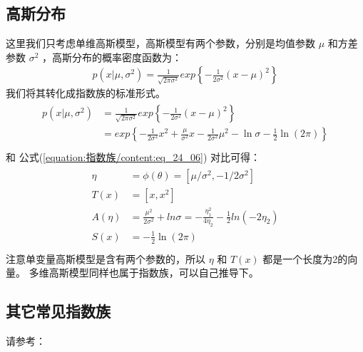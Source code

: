 \documentclass[letterpaper,10pt,english]{sphinxmanual}
\begin{document}
\subsection{高斯分布}
\label{\detokenize{_u6307_u6570_u65cf/content:id6}}
这里我们只考虑单维高斯模型，高斯模型有两个参数，分别是均值参数 \(\mu\)
和方差参数 \(\sigma^2\) ，高斯分布的概率密度函数为：
\begin{equation}\label{equation:指数族/content:指数族/content:15}
\begin{split}p(x|\mu,\sigma^2) = \frac{1}{\sqrt{2\pi\sigma^2}} exp \left \{ -\frac{1}{2\sigma^2}(x-\mu)^2 \right \}\end{split}
\end{equation}
我们将其转化成指数族的标准形式。
\begin{align}\label{equation:指数族/content:指数族/content:16}\!\begin{aligned}
p(x|\mu,\sigma^2) &= \frac{1}{\sqrt{2\pi\sigma^2}} exp \left \{ -\frac{1}{2\sigma^2}(x-\mu)^2 \right \}\\
& =  exp \left \{ -\frac{1}{2\sigma^2} x^2 + \frac{\mu}{\sigma^2} x -\frac{1}{2\sigma^2}\mu^2
 -\ln \sigma - \frac{1}{2} \ln (2\pi) \right \}\\
\end{aligned}\end{align}
和 公式(\ref{equation:指数族/content:eq_24_06}) 对比可得：
\begin{align}\label{equation:指数族/content:指数族/content:17}\!\begin{aligned}
\eta &= \phi(\theta)=\left [ \mu / \sigma^2 ,-1 /2 \sigma^2 \right ]\\
T(x) &= \left [ x ,x^2 \right ]\\
A(\eta) &= \frac{\mu^2}{2\sigma^2} +ln \sigma = -\frac{\eta_1^2}{4\eta_2} - \frac{1}{2}ln(-2\eta_2)\\
S(x) &= - \frac{1}{2} \ln (2\pi)\\
\end{aligned}\end{align}
注意单变量高斯模型是含有两个参数的，所以 \(\eta\) 和 \(T(x)\) 都是一个长度为2的向量。
多维高斯模型同样也属于指数族，可以自己推导下。


\subsection{其它常见指数族}
\label{\detokenize{_u6307_u6570_u65cf/content:id7}}
请参考：
\end{document}
